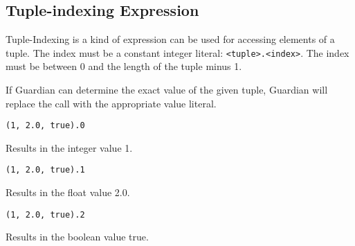 
\subsection{Tuple-indexing Expression}
{
	Tuple-Indexing is a kind of expression can be used for accessing elements
	of a tuple. The index must be a constant integer
	literal: \texttt{<tuple>.<index>}.
	The index must be between 0 and the length of the tuple minus 1.
	
	If Guardian can determine the exact value of the given tuple, Guardian
	will replace the call with the appropriate value literal.
	
	\begin{itemize}
	{
		\item[] \lstinline[language=MAIA, columns=fixed]@(1, 2.0, true).0@
		
			Results in the integer value 1.
			
		\item[] \lstinline[language=MAIA, columns=fixed]@(1, 2.0, true).1@
		
			Results in the float value 2.0.
			
		\item[] \lstinline[language=MAIA, columns=fixed]@(1, 2.0, true).2@
		
			Results in the boolean value true.
	}
	\end{itemize}
}
